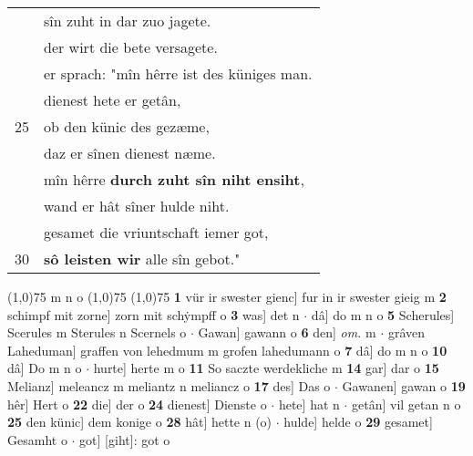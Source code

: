 \documentclass[8pt,a4paper,notitlepage]{article}
\begin{document}
\begin{table}[ht]
\begin{minipage}[t]{0.5\linewidth}
\begin{tabular}{rl}
 & sîn zuht in dar zuo jagete.\\ 
 & der wirt die bete versagete.\\ 
 & er sprach: "mîn hêrre ist des küniges man.\\ 
 & dienest hete er getân,\\ 
25 & ob den künic des gezæme,\\ 
 & daz er sînen dienest næme.\\ 
 & mîn hêrre \textbf{durch zuht sîn niht ensiht},\\ 
 & wand er hât sîner hulde niht.\\ 
 & gesamet die vriuntschaft iemer got,\\ 
30 & \textbf{sô leisten wir} alle sîn gebot."\\ 
\end{tabular}
\scriptsize
\line(1,0){75} \newline
m n o \newline
\line(1,0){75} \newline
\newline
\line(1,0){75} \newline
\textbf{1} vür ir swester gienc] fur in ir swester gieig m \textbf{2} schimpf mit zorne] zorn mit schẏmpff o \textbf{3} was] det n  $\cdot$ dâ] do m n o \textbf{5} Scherules] Scerules m Sterules n Scernels o  $\cdot$ Gawan] gawann o \textbf{6} den] \textit{om.} m  $\cdot$ grâven Laheduman] graffen von lehedmum m grofen lahedumann o \textbf{7} dâ] do m n o \textbf{10} dâ] Do m n o  $\cdot$ hurte] herte m o \textbf{11} So saczte werdekliche m \textbf{14} gar] dar o \textbf{15} Melianz] meleancz m meliantz n meliancz o \textbf{17} des] Das o  $\cdot$ Gawanen] gawan o \textbf{19} hêr] Hert o \textbf{22} die] der o \textbf{24} dienest] Dienste o  $\cdot$ hete] hat n  $\cdot$ getân] vil getan n o \textbf{25} den künic] dem konige o \textbf{28} hât] hette n (o)  $\cdot$ hulde] helde o \textbf{29} gesamet] Gesamht o  $\cdot$ got] [giht]: got o \newline
\end{minipage}
\end{table}
\newpage
\end{document}
